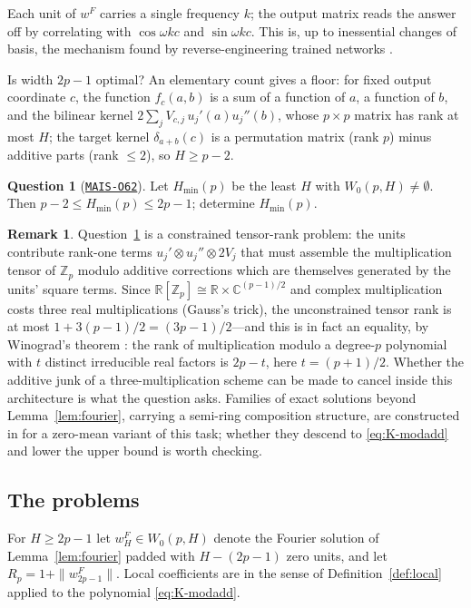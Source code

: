 \documentclass[11pt]{amsart}
\newcommand{\Oid}[1]{\href{https://github.com/lionellevine/MAIS/blob/main/open-problems/MAIS-O#1.md}{\texttt{MAIS-O#1}}}
\theoremstyle{plain}
\theoremstyle{definition}
\newtheorem{question}[theorem]{Question}
\newtheorem{remark}[theorem]{Remark}
\newcommand{\R}{\mathbb{R}}
\newcommand{\Z}{\mathbb{Z}}
\begin{document}
Each unit of $w^F$ carries a single frequency $k$; the output matrix reads the answer off by correlating with $\cos \omega k c$ and $\sin \omega k c$. This is, up to inessential changes of basis, the mechanism found by reverse-engineering trained networks \cite{nanda2023}.

Is width $2p-1$ optimal? An elementary count gives a floor: for fixed output coordinate $c$, the function $f_c(a,b)$ is a sum of a function of $a$, a function of $b$, and the bilinear kernel $2\sum_j V_{c,j}\, u_j'(a) u_j''(b)$, whose $p \times p$ matrix has rank at most $H$; the target kernel $\delta_{a+b}(c)$ is a permutation matrix (rank $p$) minus additive parts (rank $\le 2$), so $H \ge p - 2$.

\begin{question}[\Oid{62}]\label{q:width}
Let $H_{\min}(p)$ be the least $H$ with $W_0(p,H) \neq \emptyset$. Then $p - 2 \le H_{\min}(p) \le 2p - 1$; determine $H_{\min}(p)$.
\end{question}

\begin{remark}
Question~\ref{q:width} is a constrained tensor-rank problem: the units contribute rank-one terms $u_j' \otimes u_j'' \otimes 2V_j$ that must assemble the multiplication tensor of $\Z_p$ modulo additive corrections which are themselves generated by the units' square terms. Since $\R[\Z_p] \cong \R \times \mathbb{C}^{(p-1)/2}$ and complex multiplication costs three real multiplications (Gauss's trick), the unconstrained tensor rank is at most $1 + 3(p-1)/2 = (3p-1)/2$---and this is in fact an equality, by Winograd's theorem \cite{winograd1977}: the rank of multiplication modulo a degree-$p$ polynomial with $t$ distinct irreducible real factors is $2p - t$, here $t = (p+1)/2$. Whether the additive junk of a three-multiplication scheme can be made to cancel inside this architecture is what the question asks. Families of exact solutions beyond Lemma~\ref{lem:fourier}, carrying a semi-ring composition structure, are constructed in \cite{tian2024} for a zero-mean variant of this task; whether they descend to \eqref{eq:K-modadd} and lower the upper bound is worth checking.
\end{remark}

\subsection{The problems}

For $H \ge 2p-1$ let $w^F_H \in W_0(p,H)$ denote the Fourier solution of Lemma~\ref{lem:fourier} padded with $H - (2p-1)$ zero units, and let $R_p = 1 + \|w^F_{2p-1}\|$. Local coefficients are in the sense of Definition~\ref{def:local} applied to the polynomial \eqref{eq:K-modadd}.
\end{document}
